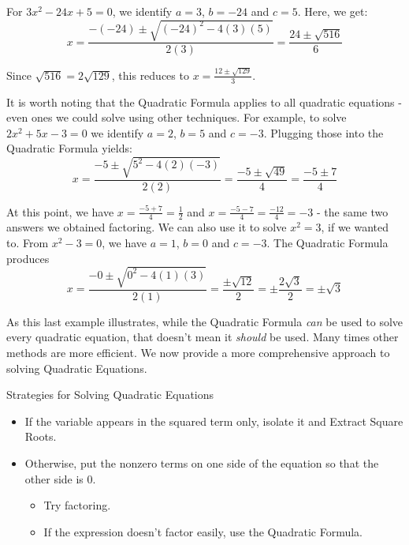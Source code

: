 For $3x^2 - 24x + 5 = 0$, we identify $a = 3$, $b = -24$ and $c = 5$.  Here, we get: \[ x = \dfrac{-(-24) \pm \sqrt{(-24)^2 - 4(3)(5)}}{2(3)} = \dfrac{24 \pm \sqrt{516}}{6} \]

Since $\sqrt{516} = 2\sqrt{129}$, this reduces to  $x = \frac{12 \pm \sqrt{129}}{3}$. 

It is worth noting that the Quadratic Formula applies to all quadratic equations - even ones we could solve using other techniques.  For example, to solve $2x^2 + 5x - 3 = 0$  we identify $a = 2$, $b = 5$ and $c = -3$.  Plugging those into the Quadratic Formula yields: \[ x = \dfrac{-5 \pm \sqrt{5^2 - 4(2)(-3)}}{2(2)} = \dfrac{-5 \pm \sqrt{49}}{4} = \dfrac{-5 \pm 7}{4} \]

At this point, we have $x = \frac{-5+7}{4} = \frac{1}{2}$ and $x = \frac{-5-7}{4} = \frac{-12}{4} = -3$ - the same two answers we obtained factoring.  We can also use it to solve $x^2 = 3$, if we wanted to.  From $x^2 -3 = 0$, we have $a = 1$, $b = 0$ and $c = -3$.  The Quadratic Formula produces \[ x = \dfrac{-0 \pm \sqrt{0^2 - 4(1)(3)}}{2(1)} = \dfrac{\pm\sqrt{12}}{2} = \pm \dfrac{2\sqrt{3}}{2} = \pm \sqrt{3}\]

As this last example illustrates, while the  Quadratic Formula \textit{can} be used to solve every quadratic equation, that doesn't mean it \textit{should} be used.  Many times other methods are more efficient.  We now provide a more comprehensive approach to solving Quadratic Equations.  

\begin{floatbox}{Strategies for Solving Quadratic Equations}
\label{solvequadraticeqns}

\begin{itemize}[leftmargin=*]

\item  If the variable appears in the squared term only, isolate it and Extract Square Roots.
\item  Otherwise, put the nonzero terms on one side of the equation so that the other side is $0$.
\begin{itemize}
\item  Try factoring.  
\item  If the expression doesn't factor easily, use the Quadratic Formula.

\end{itemize}
\end{itemize}

\end{floatbox}

